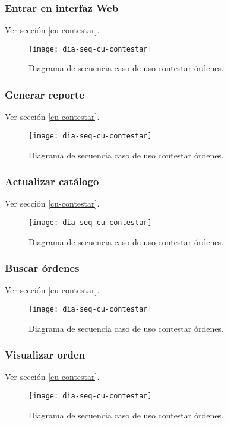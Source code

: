 \subsubsection{Entrar en interfaz Web}
Ver sección \ref{cu-contestar}.\\
\begin{figure}[h]
	\centering
	\texttt{[image: dia-seq-cu-contestar]}
	\caption{Diagrama de secuencia caso de uso contestar órdenes.}
	\label{fig:dia-seq-cu-contestar}
\end{figure}
\subsubsection{Generar reporte}
Ver sección \ref{cu-contestar}.\\
\begin{figure}[h]
	\centering
	\texttt{[image: dia-seq-cu-contestar]}
	\caption{Diagrama de secuencia caso de uso contestar órdenes.}
	\label{fig:dia-seq-cu-contestar}
\end{figure}
\subsubsection{Actualizar catálogo}
Ver sección \ref{cu-contestar}.\\
\begin{figure}[h]
	\centering
	\texttt{[image: dia-seq-cu-contestar]}
	\caption{Diagrama de secuencia caso de uso contestar órdenes.}
	\label{fig:dia-seq-cu-contestar}
\end{figure}
\subsubsection{Buscar órdenes}
Ver sección \ref{cu-contestar}.\\
\begin{figure}[h]
	\centering
	\texttt{[image: dia-seq-cu-contestar]}
	\caption{Diagrama de secuencia caso de uso contestar órdenes.}
	\label{fig:dia-seq-cu-contestar}
\end{figure}
\subsubsection{Visualizar orden}
Ver sección \ref{cu-contestar}.\\
\begin{figure}[h]
	\centering
	\texttt{[image: dia-seq-cu-contestar]}
	\caption{Diagrama de secuencia caso de uso contestar órdenes.}
	\label{fig:dia-seq-cu-contestar}
\end{figure}
